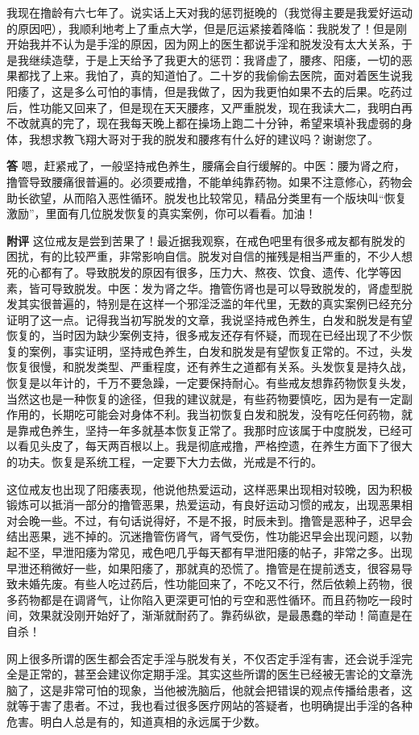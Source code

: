 \begin{case}
    我现在撸龄有六七年了。说实话上天对我的惩罚挺晚的（我觉得主要是我爱好运动的原因吧），我顺利地考上了重点大学，但是厄运紧接着降临：我脱发了！但是刚开始我并不认为是手淫的原因，因为网上的医生都说手淫和脱发没有太大关系，于是我继续造孽，于是上天给予了我更大的惩罚：我肾虚了，腰疼、阳痿，一切的恶果都找了上来。我怕了，真的知道怕了。二十岁的我偷偷去医院，面对着医生说我阳痿了，这是多么可怕的事情，但是我做了，因为我更怕如果不去的后果。吃药过后，性功能又回来了，但是现在天天腰疼，又严重脱发，现在我读大二，我明白再不改就真的完了，现在我每天晚上都在操场上跑二十分钟，希望来填补我虚弱的身体，我想求教飞翔大哥对于我的脱发和腰疼有什么好的建议吗？谢谢您了。

    \textbf{答} 嗯，赶紧戒了，一般坚持戒色养生，腰痛会自行缓解的。中医：腰为肾之府，撸管导致腰痛很普遍的。必须要戒撸，不能单纯靠药物。如果不注意修心，药物会助长欲望，从而陷入恶性循环。脱发也比较常见，精品分类里有一个版块叫“恢复激励”，里面有几位脱发恢复的真实案例，你可以看看。加油！

    \textbf{附评} 这位戒友是尝到苦果了！最近据我观察，在戒色吧里有很多戒友都有脱发的困扰，有的比较严重，非常影响自信。脱发对自信的摧残是相当严重的，不少人想死的心都有了。导致脱发的原因有很多，压力大、熬夜、饮食、遗传、化学等因素，皆可导致脱发。中医：发为肾之华。撸管伤肾也是可以导致脱发的，肾虚型脱发其实很普遍的，特别是在这样一个邪淫泛滥的年代里，无数的真实案例已经充分证明了这一点。记得我当初写脱发的文章，我说坚持戒色养生，白发和脱发是有望恢复的，当时因为缺少案例支持，很多戒友还存有怀疑，而现在已经出现了不少恢复的案例，事实证明，坚持戒色养生，白发和脱发是有望恢复正常的。不过，头发恢复很慢，和脱发类型、严重程度，还有养生之道都有关系。头发恢复是持久战，恢复是以年计的，千万不要急躁，一定要保持耐心。有些戒友想靠药物恢复头发，当然这也是一种恢复的途径，但我的建议就是，有些药物要慎吃，因为是有一定副作用的，长期吃可能会对身体不利。我当初恢复白发和脱发，没有吃任何药物，就是靠戒色养生，坚持一年多就基本恢复正常了。我那时应该属于中度脱发，已经可以看见头皮了，每天两百根以上。我是彻底戒撸，严格控遗，在养生方面下了很大的功夫。恢复是系统工程，一定要下大力去做，光戒是不行的。

    这位戒友也出现了阳痿表现，他说他热爱运动，这样恶果出现相对较晚，因为积极锻炼可以抵消一部分的撸管恶果，热爱运动，有良好运动习惯的戒友，出现恶果相对会晚一些。不过，有句话说得好，不是不报，时辰未到。撸管是恶种子，迟早会结出恶果，逃不掉的。沉迷撸管伤肾气，肾气受伤，性功能迟早会出现问题，以勃起不坚，早泄阳痿为常见，戒色吧几乎每天都有早泄阳痿的帖子，非常之多。出现早泄还稍微好一些，如果阳痿了，那就真的恐慌了。撸管是在提前透支，很容易导致未婚先废。有些人吃过药后，性功能回来了，不吃又不行，然后依赖上药物，很多药物都是在调肾气，让你陷入更深更可怕的亏空和恶性循环。而且药物吃一段时间，效果就没刚开始好了，渐渐就耐药了。靠药纵欲，是最愚蠢的举动！简直是在自杀！

    网上很多所谓的医生都会否定手淫与脱发有关，不仅否定手淫有害，还会说手淫完全是正常的，甚至会建议你定期手淫。其实这些所谓的医生已经被无害论的文章洗脑了，这是非常可怕的现象，当他被洗脑后，他就会把错误的观点传播给患者，这就等于害了患者。不过，我也看过很多医疗网站的答疑者，也明确提出手淫的各种危害。明白人总是有的，知道真相的永远属于少数。
\end{case}

